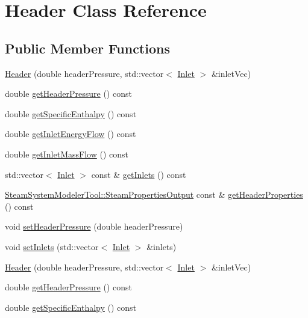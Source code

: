 \hypertarget{class_header}{}\section{Header Class Reference}
\label{class_header}
\subsection*{Public Member Functions}
\begin{DoxyCompactItemize}
\item 
\hyperlink{class_header_a59b836abde0be58bec65ebea1ac67a3b}{Header} (double header\+Pressure, std\+::vector$<$ \hyperlink{class_inlet}{Inlet} $>$ \&inlet\+Vec)
\item 
double \hyperlink{class_header_adc2e6daaf9f5e633c3db96ff3990f1f6}{get\+Header\+Pressure} () const
\item 
double \hyperlink{class_header_af913dbf132f8cb3af6e6b374813acd93}{get\+Specific\+Enthalpy} () const
\item 
double \hyperlink{class_header_a2a30ee96fa76bab1533cb9ceea0c8af3}{get\+Inlet\+Energy\+Flow} () const
\item 
double \hyperlink{class_header_ad572e6144481b9e9f65004aacebd701c}{get\+Inlet\+Mass\+Flow} () const
\item 
std\+::vector$<$ \hyperlink{class_inlet}{Inlet} $>$ const  \& \hyperlink{class_header_a625d7317488c88c949acd05c72a7c54a}{get\+Inlets} () const
\item 
\hyperlink{struct_steam_system_modeler_tool_1_1_steam_properties_output}{Steam\+System\+Modeler\+Tool\+::\+Steam\+Properties\+Output} const  \& \hyperlink{class_header_a0d27b0e1b3c16cc24b4ba6f64abb7cb0}{get\+Header\+Properties} () const
\item 
void \hyperlink{class_header_a3af0b7964b74287ce0c662b9a88556ed}{set\+Header\+Pressure} (double header\+Pressure)
\item 
void \hyperlink{class_header_ae69b6f894210a6cd340e92222f8bc343}{set\+Inlets} (std\+::vector$<$ \hyperlink{class_inlet}{Inlet} $>$ \&inlets)
\item 
\hyperlink{class_header_a59b836abde0be58bec65ebea1ac67a3b}{Header} (double header\+Pressure, std\+::vector$<$ \hyperlink{class_inlet}{Inlet} $>$ \&inlet\+Vec)
\item 
double \hyperlink{class_header_adc2e6daaf9f5e633c3db96ff3990f1f6}{get\+Header\+Pressure} () const
\item 
double \hyperlink{class_header_af913dbf132f8cb3af6e6b374813acd93}{get\+Specific\+Enthalpy} () const

\end{DoxyCompactItemize}
